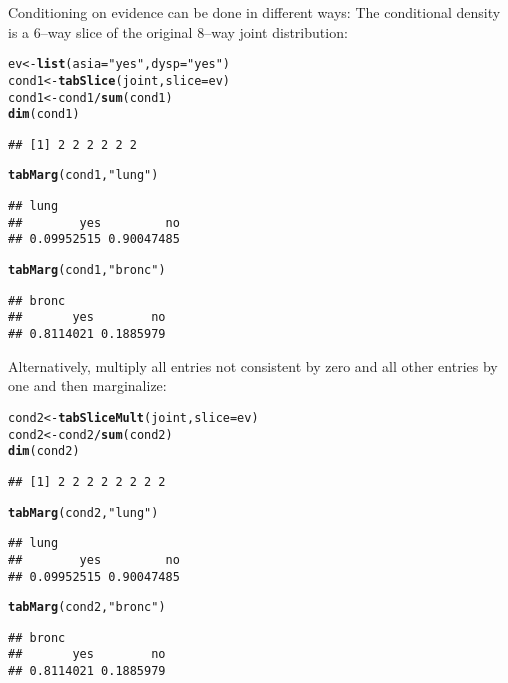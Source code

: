 \documentclass[10pt]{article}\usepackage[]{graphicx}\usepackage[]{xcolor}
\makeatletter
\newcommand{\hlstr}[1]{\textcolor[rgb]{0.192,0.494,0.8}{#1}}%
\newcommand{\hlopt}[1]{\textcolor[rgb]{0,0,0}{#1}}%
\newcommand{\hlstd}[1]{\textcolor[rgb]{0.345,0.345,0.345}{#1}}%
\newcommand{\hlkwb}[1]{\textcolor[rgb]{0.69,0.353,0.396}{#1}}%
\newcommand{\hlkwc}[1]{\textcolor[rgb]{0.333,0.667,0.333}{#1}}%
\newcommand{\hlkwd}[1]{\textcolor[rgb]{0.737,0.353,0.396}{\textbf{#1}}}%
\newenvironment{kframe}{%
 \def\at@end@of@kframe{}%
 \ifinner\ifhmode%
  \def\at@end@of@kframe{\end{minipage}}%
  \begin{minipage}{\columnwidth}%
 \fi\fi%
 \def\FrameCommand##1{\hskip\@totalleftmargin \hskip-\fboxsep
 \colorbox{shadecolor}{##1}\hskip-\fboxsep
     \hskip-\linewidth \hskip-\@totalleftmargin \hskip\columnwidth}%
 \MakeFramed {\advance\hsize-\width
   \@totalleftmargin\z@ \linewidth\hsize
   \@setminipage}}%
 {\par\unskip\endMakeFramed%
 \at@end@of@kframe}
\newenvironment{knitrout}{}{} %
\makeatother
\begin{document}
Conditioning on evidence can be done in different ways: The
conditional density is a $6$--way slice of the original $8$--way joint
distribution:

\begin{knitrout}
\color{fgcolor}\begin{kframe}
\begin{alltt}
\hlstd{ev} \hlkwb{<-} \hlkwd{list}\hlstd{(}\hlkwc{asia}\hlstd{=}\hlstr{"yes"}\hlstd{,} \hlkwc{dysp}\hlstd{=}\hlstr{"yes"}\hlstd{)}
\hlstd{cond1} \hlkwb{<-} \hlkwd{tabSlice}\hlstd{(joint,} \hlkwc{slice}\hlstd{=ev)}
\hlstd{cond1} \hlkwb{<-} \hlstd{cond1} \hlopt{/} \hlkwd{sum}\hlstd{(cond1)}
\hlkwd{dim}\hlstd{(cond1)}
\end{alltt}
\begin{verbatim}
## [1] 2 2 2 2 2 2
\end{verbatim}
\begin{alltt}
\hlkwd{tabMarg}\hlstd{(cond1,} \hlstr{"lung"}\hlstd{)}
\end{alltt}
\begin{verbatim}
## lung
##        yes         no 
## 0.09952515 0.90047485
\end{verbatim}
\begin{alltt}
\hlkwd{tabMarg}\hlstd{(cond1,} \hlstr{"bronc"}\hlstd{)}
\end{alltt}
\begin{verbatim}
## bronc
##       yes        no 
## 0.8114021 0.1885979
\end{verbatim}
\end{kframe}
\end{knitrout}

Alternatively, multiply all entries not consistent by zero and all other entries by one and then marginalize:
\begin{knitrout}
\color{fgcolor}\begin{kframe}
\begin{alltt}
\hlstd{cond2} \hlkwb{<-} \hlkwd{tabSliceMult}\hlstd{(joint,} \hlkwc{slice}\hlstd{=ev)}
\hlstd{cond2} \hlkwb{<-} \hlstd{cond2} \hlopt{/} \hlkwd{sum}\hlstd{(cond2)}
\hlkwd{dim}\hlstd{(cond2)}
\end{alltt}
\begin{verbatim}
## [1] 2 2 2 2 2 2 2 2
\end{verbatim}
\begin{alltt}
\hlkwd{tabMarg}\hlstd{(cond2,} \hlstr{"lung"}\hlstd{)}
\end{alltt}
\begin{verbatim}
## lung
##        yes         no 
## 0.09952515 0.90047485
\end{verbatim}
\begin{alltt}
\hlkwd{tabMarg}\hlstd{(cond2,} \hlstr{"bronc"}\hlstd{)}
\end{alltt}
\begin{verbatim}
## bronc
##       yes        no 
## 0.8114021 0.1885979
\end{verbatim}
\end{kframe}
\end{knitrout}
\end{document}
